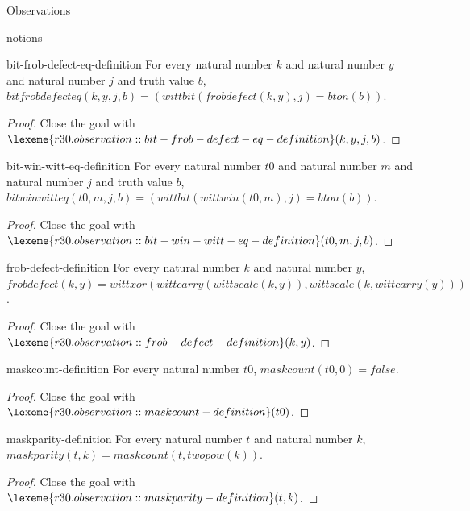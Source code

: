 \begin{lexlean}{Observations}
\begin{section}{notions}
\begin{lemma}{bit-frob-defect-eq-definition}
For every natural number \(k\) and natural number \(y\) and natural number \(j\) and truth value \(b\), \(bitfrobdefecteq(k, y, j, b) = (wittbit(frobdefect(k, y), j) = bton(b))\).
\begin{proof}
Close the goal with \(\lexeme{r30.observation::bit-frob-defect-eq-definition}(k, y, j, b)\).
\end{proof}
\end{lemma}

\begin{lemma}{bit-win-witt-eq-definition}
For every natural number \(t0\) and natural number \(m\) and natural number \(j\) and truth value \(b\), \(bitwinwitteq(t0, m, j, b) = (wittbit(wittwin(t0, m), j) = bton(b))\).
\begin{proof}
Close the goal with \(\lexeme{r30.observation::bit-win-witt-eq-definition}(t0, m, j, b)\).
\end{proof}
\end{lemma}

\begin{lemma}{frob-defect-definition}
For every natural number \(k\) and natural number \(y\), \(frobdefect(k, y) = wittxor(wittcarry(wittscale(k, y)), wittscale(k, wittcarry(y)))\).
\begin{proof}
Close the goal with \(\lexeme{r30.observation::frob-defect-definition}(k, y)\).
\end{proof}
\end{lemma}

\begin{lemma}{maskcount-definition}
For every natural number \(t0\), \(maskcount(t0, 0) = false\).
\begin{proof}
Close the goal with \(\lexeme{r30.observation::maskcount-definition}(t0)\).
\end{proof}
\end{lemma}

\begin{lemma}{maskparity-definition}
For every natural number \(t\) and natural number \(k\), \(maskparity(t, k) = maskcount(t, twopow(k))\).
\begin{proof}
Close the goal with \(\lexeme{r30.observation::maskparity-definition}(t, k)\).
\end{proof}
\end{lemma}


\end{section}
\end{lexlean}
